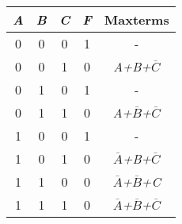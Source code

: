 \begin{tabular}{|c|c|c|c|c|}
\hline
\textit{\textbf{A}} & \textit{\textbf{B}} & \textit{\textbf{C}} & \textit{\textbf{F}} & \textbf{Maxterms}                                     \\ \hline
0                   & 0                   & 0                   & 1                   & -                                                     \\
0                   & 0                   & 1                   & 0                   & \textit{A+B+$\overline{C}$}                           \\
0                   & 1                   & 0                   & 1                   & -                                                     \\
0                   & 1                   & 1                   & 0                   & \textit{A+$\overline{B}$+$\overline{C}$}              \\
1                   & 0                   & 0                   & 1                   & -                                                     \\
1                   & 0                   & 1                   & 0                   & \textit{$\overline{A}$+B+$\overline{C}$}              \\
1                   & 1                   & 0                   & 0                   & \textit{$\overline{A}$+$\overline{B}$+C}              \\
1                   & 1                   & 1                   & 0                   & \textit{$\overline{A}$+$\overline{B}$+$\overline{C}$} \\ \hline
\end{tabular}